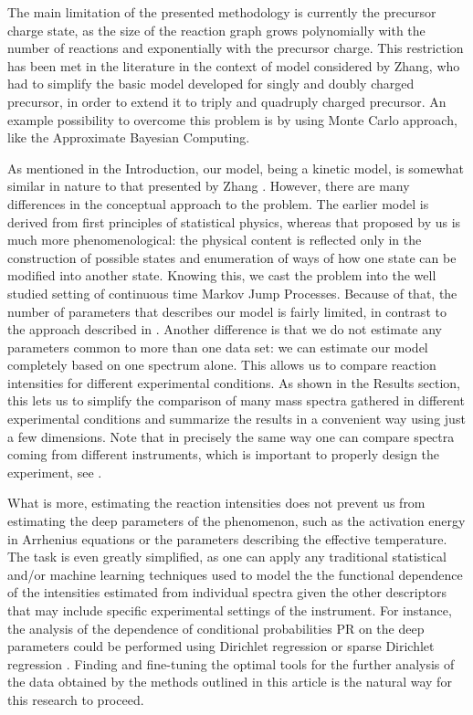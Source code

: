 \documentclass{llncs}
\begin{document}
        The main limitation of the presented methodology is currently the precursor charge state, as the size of the reaction graph grows polynomially  with the number of reactions and exponentially with the precursor charge. This restriction has been met in the literature in the context of model considered by Zhang, who had to simplify the basic model developed for singly and doubly charged precursor, in order to extend it to triply and quadruply charged precursor. An example possibility to overcome this problem is by using Monte Carlo approach, like the Approximate Bayesian Computing.

        As mentioned in the Introduction, our model, being a kinetic model, is somewhat similar in nature to that presented by Zhang \cite{Zhang2010-fp}. However, there are many differences in the conceptual approach to the problem. The earlier model is derived from first principles of statistical physics, whereas that proposed by us is much more phenomenological: the physical content is reflected only in the construction of possible states and enumeration of ways of how one state can be modified into another state. Knowing this, we cast the problem into the well studied setting of continuous time Markov Jump Processes. Because of that, the number of parameters that describes our model is fairly limited, in contrast to the approach described in  \cite{Zhang2010-fp}. Another difference is that we do not estimate any parameters common to more than one data set: we can estimate our model completely based on one spectrum alone. This allows us to compare reaction intensities for different experimental conditions. As shown in the Results section, this lets us to simplify the comparison of many mass spectra gathered in different experimental conditions and summarize the results in a convenient way using just a few dimensions. Note that in precisely the same way one can compare spectra coming from different instruments, which is important to properly design the experiment, see \cite{Lermyte2015-lm}.

        What is more, estimating the reaction intensities does not prevent us from estimating the deep parameters of the phenomenon, such as the activation energy in Arrhenius equations or the parameters describing the effective temperature. The task is even greatly simplified, as one can apply any traditional statistical and/or machine learning techniques used to model the the functional dependence of the intensities estimated from individual spectra given the other descriptors that may include specific experimental settings of the instrument. For instance, the analysis of the dependence of conditional probabilities PR on the deep parameters could be performed using Dirichlet regression or sparse Dirichlet regression \cite{Chen2013-zb}. Finding and fine-tuning the optimal tools for the further analysis of the data obtained by the methods outlined in this article is the natural way for this research to proceed.
\end{document}
